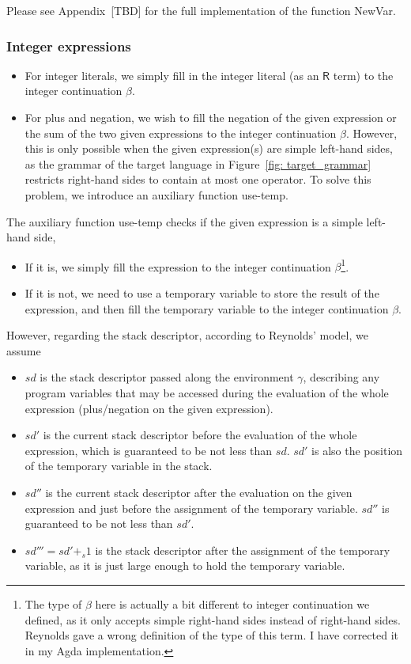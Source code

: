 \documentclass[12pt,a4paper]{report}
\theoremstyle{definition}
\begin{document}
        Please see Appendix~[TBD] for the full implementation of the function \textsf{NewVar}.

        \subsubsection{Integer expressions} \label{subsubsec: compiler_intexp}
        \begin{itemize}
            \item For integer literals, we simply fill in the integer literal (as an $\mathsf{R}$ term) to the integer continuation $\beta$.
            \item For plus and negation, we wish to fill the negation of the given expression or the sum of the two given expressions to the integer continuation $\beta$. However, this is only possible when the given expression(s) are simple left-hand sides, as the grammar of the target language in Figure~\ref{fig: target_grammar} restricts right-hand sides to contain at most one operator. To solve this problem, we introduce an auxiliary function \textsf{use-temp}.
        \end{itemize}
        The auxiliary function \textsf{use-temp} checks if the given expression is a simple left-hand side,
        \begin{itemize}
            \item If it is, we simply fill the expression to the integer continuation $\beta$\footnote{The type of $\beta$ here is actually a bit different to integer continuation we defined, as it only accepts simple right-hand sides instead of right-hand sides. Reynolds gave a wrong definition of the type of this term. I have corrected it in my Agda implementation.}.
            \item If it is not, we need to use a temporary variable to store the result of the expression, and then fill the temporary variable to the integer continuation $\beta$.
        \end{itemize}
        However, regarding the stack descriptor, according to Reynolds' model, we assume
        \begin{itemize}
            \item $sd$ is the stack descriptor passed along the environment $\gamma$, describing any program variables that may be accessed during the evaluation of the whole expression (plus/negation on the given expression).
            \item $sd'$ is the current stack descriptor before the evaluation of the whole expression, which is guaranteed to be not less than $sd$. $sd'$ is also the position of the temporary variable in the stack.
            \item $sd''$ is the current stack descriptor after the evaluation on the given expression and just before the assignment of the temporary variable. $sd''$ is guaranteed to be not less than $sd'$.
            \item $sd''' = sd' +_s 1$ is the stack descriptor after the assignment of the temporary variable, as it is just large enough to hold the temporary variable.
        \end{itemize}
\end{document}
